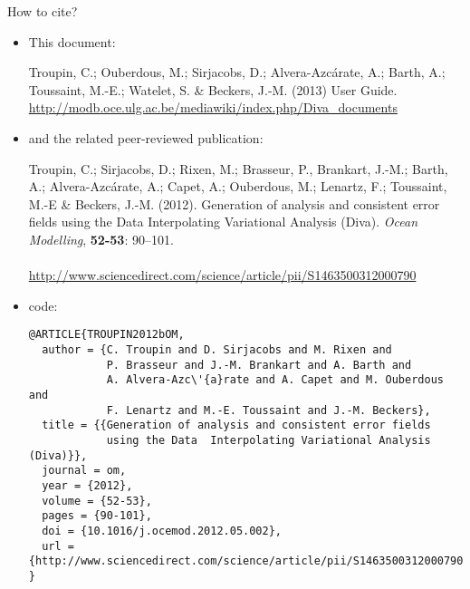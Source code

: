 \newpage

\vspace*{\fill}

\begin{center}
\begin{minipage}[c]{.85\textwidth}
\Large{How to cite?}
\vspace{1cm}
\normalsize


\begin{itemize}
\item This document:


Troupin, C.; Ouberdous, M.; Sirjacobs, D.; Alvera-Azcárate, A.; Barth, A.; Toussaint, M.-E.; Watelet, S. \& Beckers, J.-M. (2013) \diva User Guide.\\
\url{http://modb.oce.ulg.ac.be/mediawiki/index.php/Diva_documents}


\item and the related peer-reviewed publication:


Troupin, C.; Sirjacobs, D.; Rixen, M.; Brasseur, P., Brankart, J.-M.; Barth,
A.; Alvera-Azc\'{a}rate, A.; Capet, A.; Ouberdous, M.; Lenartz, F.;
Toussaint, M.-E \& Beckers, J.-M. (2012).
Generation of analysis and consistent error fields using the Data
Interpolating Variational Analysis (Diva).
\emph{Ocean Modelling}, \textbf{52-53}: 90--101.\\
\\
\url{http://www.sciencedirect.com/science/article/pii/S1463500312000790}

\item[]

{\scriptsize
\BibTeX code:
\begin{verbatim}
@ARTICLE{TROUPIN2012bOM,
  author = {C. Troupin and D. Sirjacobs and M. Rixen and 
            P. Brasseur and J.-M. Brankart and A. Barth and 
            A. Alvera-Azc\'{a}rate and A. Capet and M. Ouberdous and 
            F. Lenartz and M.-E. Toussaint and J.-M. Beckers},
  title = {{Generation of analysis and consistent error fields 
            using the Data 	Interpolating Variational Analysis (Diva)}},
  journal = om,
  year = {2012},
  volume = {52-53},
  pages = {90-101},
  doi = {10.1016/j.ocemod.2012.05.002},
  url = {http://www.sciencedirect.com/science/article/pii/S1463500312000790}
}
\end{verbatim}
}

\end{itemize}


\vspace{.25cm}
\end{minipage}

\end{center}

\vspace*{\fill}

